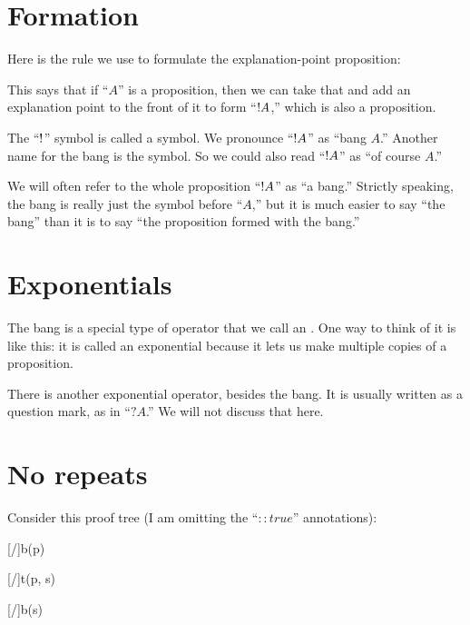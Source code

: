 \documentclass[../../../main.tex]{subfiles}
\begin{document}
\section{Formation}

Here is the rule we use to formulate the explanation-point proposition:

\begin{prooftree*}
\end{prooftree*}

\noindent
This says that if ``$A$'' is a proposition, then we can take that and add an explanation point to the front of it to form ``$\bang/A$,'' which is also a proposition.

The ``$\bang/$'' symbol is called a  symbol. We pronounce ``$\bang/A$'' as ``bang $A$.'' Another name for the bang is the  symbol. So we could also read ``$\bang/A$'' as ``of course $A$.''

We will often refer to the whole proposition ``$\bang/A$'' as ``a bang.'' Strictly speaking, the bang is really just the symbol before ``$A$,'' but it is much easier to say ``the bang'' than it is to say ``the proposition formed with the bang.''


\section{Exponentials}

The bang is a special type of operator that we call an . One way to think of it is like this: it is called an exponential because it lets us make multiple copies of a proposition. 

There is another exponential operator, besides the bang. It is usually written as a question mark, as in ``$?A$.'' We will not discuss that here.


\section{No repeats}

Consider this proof tree (I am omitting the ``$:: true$'' annotations):

\begin{prooftree*}
  \hypo{}
  [\startrule/]{b(p)}
  
  \hypo{}
  [\startrule/]{t(p, s)}
  
  [\traderule/]{b(s)}
\end{prooftree*}
\end{document}
